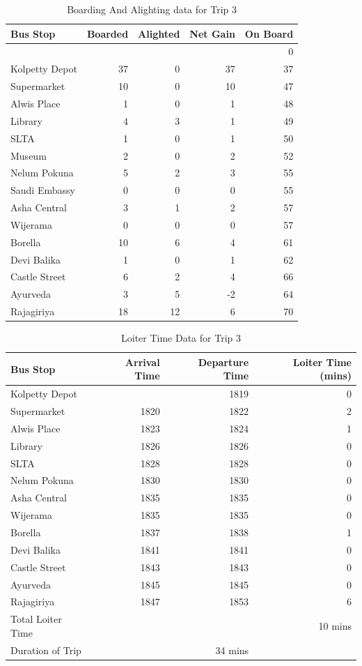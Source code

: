 \documentclass[12pt, oneside]{report}
\begin{document}
\begin{table}
\centering
\begin{tabular}{|l|r|r|r|r|}
\hline
Bus Stop & Boarded & Alighted & Net Gain & On Board \\
\hline
 & & & & 0 \\
Kolpetty Depot	&37	&0	&37	&37\\
Supermarket	&10	&0	&10	&47\\
Alwis Place	&1	&0	&1	&48\\
Library	&4	&3	&1	&49\\
SLTA	&1	&0	&1	&50\\
\rowcolor[gray]{0.7}
Museum	&2	&0	&2	&52\\
Nelum Pokuna	&5	&2	&3	&55\\
Saudi Embassy	&0	&0	&0	&55\\
Asha Central	&3	&1	&2	&57\\
Wijerama	&0	&0	&0	&57\\
Borella	&10	&6	&4	&61\\
Devi Balika	&1	&0	&1	&62\\
Castle Street	&6	&2	&4	&66\\
Ayurveda	&3	&5	&-2	&64\\
Rajagiriya	&18	&12	&6	&70\\
\hline
\end{tabular}
\caption{Boarding And Alighting data for Trip 3}
\label{table-trip3-BoardingAndAlighting}
\end{table}

\begin{table}
\centering
\begin{tabular}{|l|r|r|r|}
\hline
Bus Stop & Arrival Time & Departure Time & Loiter Time (mins) \\
\hline
Kolpetty Depot	&	&1819	&0\\
Supermarket	&1820	&1822	&2\\
Alwis Place	&1823	&1824	&1\\
Library	&1826	&1826	&0\\
SLTA	&1828	&1828	&0\\
Nelum Pokuna	&1830	&1830	&0\\
Asha Central	&1835	&1835	&0\\
Wijerama	&1835	&1835	&0\\
Borella	&1837	&1838	&1\\
Devi Balika	&1841	&1841	&0\\
Castle Street	&1843	&1843	&0\\
Ayurveda	&1845	&1845	&0\\
Rajagiriya	&1847	&1853	&6\\
\hline
Total Loiter Time & & & 10 mins \\
Duration of Trip & & 34 mins & \\
\hline
\end{tabular}
\caption{Loiter Time Data for Trip 3}
\label{table-trip3-LoiterTime}
\end{table}
\end{document}
